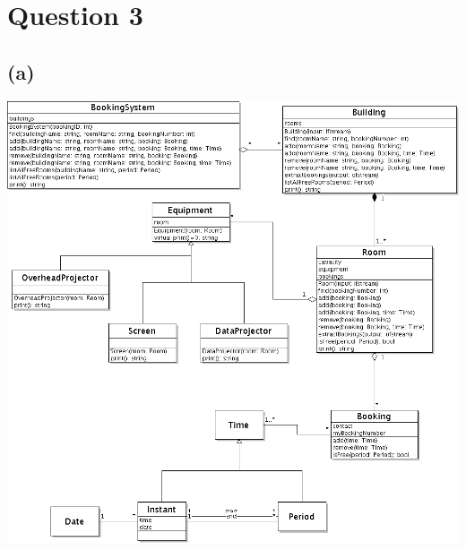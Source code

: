 \documentclass{article}[12pt]
\begin{document}
\section*{Question 3}
\subsection*{(a)}
\includegraphics[scale=0.55]{a2q3a_new.png}
\end{document}

